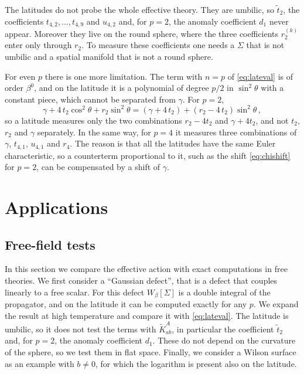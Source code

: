 \documentclass[a4paper,11pt]{article}
\newcommand{\Kt}{\widetilde{K}}
\begin{document}
The latitudes do not probe the whole effective theory. They are umbilic, so $\tilde t_2$, the coefficients $t_{4,2},\dots,t_{4,9}$ and $u_{4,2}$ and, for $p=2$, the anomaly coefficient $d_1$ never appear. Moreover they live on the round sphere, where the three coefficients $r_2^{(k)}$ enter only through $r_2$. To measure these coefficients one needs a $\Sigma$ that is not umbilic and a spatial manifold that is not a round sphere.

For even $p$ there is one more limitation. The term with $n=p$ of \eqref{eq:lateval} is of order $\beta^0$, and on the latitude it is a polynomial of degree $p/2$ in $\sin^2\theta$ with a constant piece, which cannot be separated from $\gamma$. For $p=2$,
	\begin{equation}\label{eq:p2lat}
		\gamma+4\,t_2\cos^2\theta+r_2\sin^2\theta=(\gamma+4\,t_2)+(r_2-4\,t_2)\sin^2\theta\, ,
	\end{equation}
	so a latitude measures only the two combinations $r_2-4t_2$ and $\gamma+4t_2$, and not $t_2$, $r_2$ and $\gamma$ separately. In the same way, for $p=4$ it measures three combinations of $\gamma$, $t_{4,1}$, $u_{4,1}$ and $r_4$. The reason is that all the latitudes have the same Euler characteristic, so a counterterm proportional to it, such as the shift \eqref{eq:chishift} for $p=2$, can be compensated by a shift of $\gamma$.



\section{Applications}
\subsection{Free-field tests}\label{sec:tests}


In this section we compare the effective action with exact computations in free theories. We first consider a ``Gaussian defect'', that is a defect that couples linearly to a free scalar. For this defect $W_\beta[\Sigma]$ is a double integral of the propagator, and on the latitude it can be computed exactly for any $p$. We expand the result at high temperature and compare it with \eqref{eq:lateval}. The latitude is umbilic, so it does not test the terms with $\Kt^A_{ab}$, in particular the coefficient $\tilde t_2$ and, for $p=2$, the anomaly coefficient $d_1$. These do not depend on the curvature of the sphere, so we test them in flat space. Finally, we consider a Wilson surface as an example with $b\neq0$, for which the logarithm is present also on the latitude.
	
\end{document}
